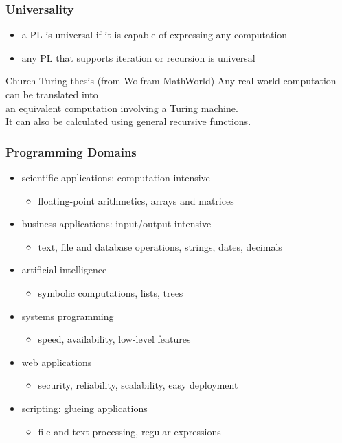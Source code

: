 \documentclass[dvipsnames]{beamer}
\theoremstyle{plain}
\begin{document}
\begin{frame}
  \frametitle{Universality}

  \begin{itemize}
    \item a PL is \alert{universal}
      if it is capable of expressing any computation
    \item any PL that supports iteration or recursion is universal
  \end{itemize}

  \pause
  \medskip
  \begin{block}{Church-Turing thesis (from Wolfram MathWorld)}
    Any real-world computation can be translated into\\
    an equivalent computation involving a Turing machine.\\
    It can also be calculated using general recursive functions.
  \end{block}
\end{frame}

\begin{frame}
  \frametitle{Programming Domains}

  \begin{itemize}
    \item scientific applications: computation intensive
    \begin{itemize}
      \item floating-point arithmetics, arrays and matrices
    \end{itemize}

    \item business applications: input/output intensive
    \begin{itemize}
      \item text, file and database operations, strings, dates, decimals
    \end{itemize}

    \item artificial intelligence
    \begin{itemize}
      \item symbolic computations, lists, trees
    \end{itemize}

    \item systems programming
    \begin{itemize}
      \item speed, availability, low-level features
    \end{itemize}

    \item web applications
    \begin{itemize}
      \item security, reliability, scalability, easy deployment
    \end{itemize}

    \item scripting: glueing applications
    \begin{itemize}
      \item file and text processing, regular expressions
    \end{itemize}
  \end{itemize}
\end{frame}
\end{document}
